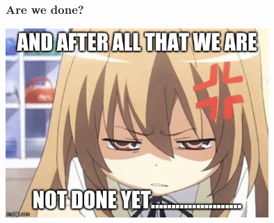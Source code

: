 \documentclass[aspectratio=169]{beamer}
\begin{document}
{
\begin{frame}
  \frametitle{Are we done?}
  \begin{center}
    \includegraphics[width=10cm]{frustrated-meme}
  \end{center}
\end{frame}
}
\end{document}
